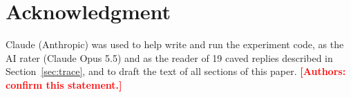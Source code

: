 \documentclass[conference]{IEEEtran}
\newcommand{\todo}[1]{\textcolor{red}{\textbf{[#1]}}}
\begin{document}
\section*{Acknowledgment}
Claude (Anthropic) was used to help write and run the experiment code, as the AI rater (Claude Opus 5.5) and as the reader of 19 caved replies described in Section~\ref{sec:trace}, and to draft the text of all sections of this paper. \todo{Authors: confirm this statement.}



\end{document}
